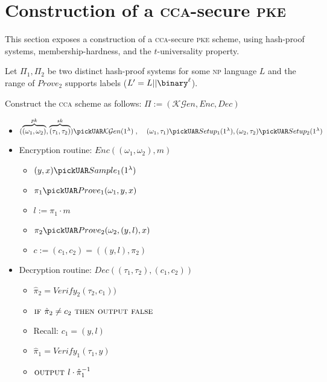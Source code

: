 
\section{Construction of a \textsc{cca}-secure \textsc{pke}}

This section exposes a construction of a \textsc{cca}-secure \textsc{pke} scheme, using hash-proof systems, membership-hardness, and the $t$-universality property.

Let $\Pi_1, \Pi_2$ be two distinct hash-proof systems for some \textsc{np} language $L$ and the range of $Prove_2$ supports labels ($L'=L||\binary^\ell$).

Construct the \textsc{cca} scheme as follows: $\Pi := (\mathcal{KG}en, Enc, Dec)$
\begin{itemize}
    \item $ (\overbrace{(\omega_1,\omega_2)}^{pk}, \overbrace{(\tau_1,\tau_2)}^{sk}) \pickUAR \mathcal{KG}en(1^\lambda)\;,\;\;\;\;(\omega_1, \tau_1) \pickUAR Setup_1(1^\lambda), (\omega_2, \tau_2) \pickUAR Setup_2(1^\lambda)$
    \item Encryption routine: $Enc((\omega_1, \omega_2), m)$
    \begin{itemize}
        \item $ (y, x) \pickUAR Sample_1(1^\lambda)$
        \item $ \pi_1 \pickUAR Prove_1(\omega_1, y, x)$
        \item $ l := \pi_1 \cdot m$
        \item $ \pi_2 \pickUAR Prove_2(\omega_2, (y, l), x)$
        \item $ c := (c_1, c_2) = ((y, l), \pi_2)$
    \end{itemize}
    \item Decryption routine: $Dec((\tau_1, \tau_2), (c_1, c_2))$
    \begin{itemize}
        \item $\hat{\pi}_2 = Verify_2(\tau_2, c_1))$
        \item $\textsc{if } \hat{\pi}_2 \neq c_2 \textsc{ then output false}$
        \item Recall: $c_1 = (y, l)$
        \item $\hat{\pi}_1 = Verify_1(\tau_1, y)$
        \item $\textsc{output } l \cdot \hat{\pi}_1^{-1}$
    \end{itemize}
\end{itemize}

